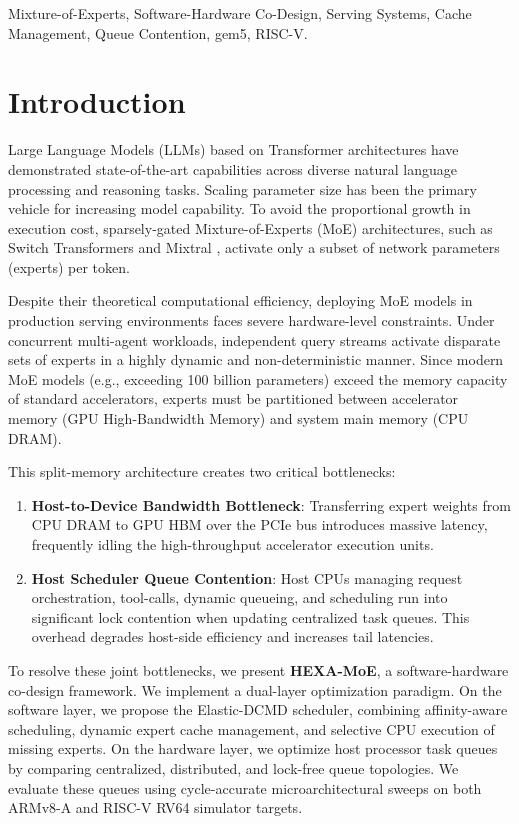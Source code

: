 \documentclass[conference]{IEEEtran}
\begin{document}
\begin{IEEEkeywords}
Mixture-of-Experts, Software-Hardware Co-Design, Serving Systems, Cache Management, Queue Contention, gem5, RISC-V.
\end{IEEEkeywords}

\section{Introduction}
Large Language Models (LLMs) based on Transformer architectures have demonstrated state-of-the-art capabilities across diverse natural language processing and reasoning tasks. Scaling parameter size has been the primary vehicle for increasing model capability. To avoid the proportional growth in execution cost, sparsely-gated Mixture-of-Experts (MoE) architectures, such as Switch Transformers \cite{fedus2022switch} and Mixtral \cite{jiang2024mixtral}, activate only a subset of network parameters (experts) per token.

Despite their theoretical computational efficiency, deploying MoE models in production serving environments faces severe hardware-level constraints. Under concurrent multi-agent workloads, independent query streams activate disparate sets of experts in a highly dynamic and non-deterministic manner. Since modern MoE models (e.g., exceeding 100 billion parameters) exceed the memory capacity of standard accelerators, experts must be partitioned between accelerator memory (GPU High-Bandwidth Memory) and system main memory (CPU DRAM). 

This split-memory architecture creates two critical bottlenecks:
\begin{enumerate}
    \item \textbf{Host-to-Device Bandwidth Bottleneck}: Transferring expert weights from CPU DRAM to GPU HBM over the PCIe bus introduces massive latency, frequently idling the high-throughput accelerator execution units.
    \item \textbf{Host Scheduler Queue Contention}: Host CPUs managing request orchestration, tool-calls, dynamic queueing, and scheduling run into significant lock contention when updating centralized task queues. This overhead degrades host-side efficiency and increases tail latencies.
\end{enumerate}

To resolve these joint bottlenecks, we present \textbf{HEXA-MoE}, a software-hardware co-design framework. We implement a dual-layer optimization paradigm. On the software layer, we propose the Elastic-DCMD scheduler, combining affinity-aware scheduling, dynamic expert cache management, and selective CPU execution of missing experts. On the hardware layer, we optimize host processor task queues by comparing centralized, distributed, and lock-free queue topologies. We evaluate these queues using cycle-accurate microarchitectural sweeps on both ARMv8-A and RISC-V RV64 simulator targets.
\end{document}

